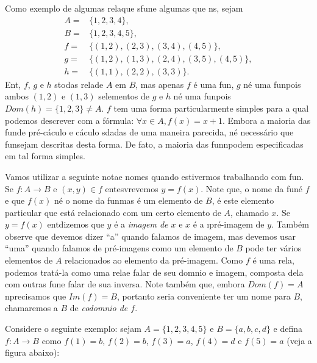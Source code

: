 Como exemplo de algumas rela\coes que s\ao fun\coes e algumas que n\ao s\aoi, sejam
\begin{equation*}
 \begin{aligned}
A=&\{1,2,3,4\},\\
B=&\{1,2,3,4,5\},\\
f=&\{(1,2),(2,3),(3,4),(4,5)\},\\
g=&\{(1,2),(1,3),(2,4),(3,5),(4,5)\},\\
h=&\{(1,1),(2,2),(3,3)\}.
 \end{aligned}
\end{equation*}
Ent\aoi, $f$, $g$ e $h$ s\ao todas rela\coes de $A$ em $B$, mas apenas $f$ \'e uma fun\caoi, $g$ n\ao \'e uma fun\cao pois ambos $(1,2)$ e $(1,3)$ s\ao elementos de $g$ e $h$ n\ao \'e uma fun\cao pois $Dom(h)=\{1,2,3\}\neq A$. $f$ tem uma forma particularmente simples para a qual podemos descrever com a f\'ormula: $\forall x\in A, f(x)=x+1$. Embora a maioria das fun\coes de pr\'e-c\'aculo e c\'aculo s\ao dadas de uma maneira parecida, n\ao \'e necess\'ario que fun\coes sejam descritas desta forma. De fato, a maioria das fun\coes n\ao podem especificadas em tal forma simples.

Vamos utilizar a seguinte nota\cao e nomes quando estivermos trabalhando com fun\cois. Se $f:A\to B$ e $(x,y)\in f$ ent\ao esvrevemos $y=f(x)$. Note que, o nome da fun\cao \'e $f$ e que $f(x)$ n\ao \'e o nome da fun\cao mas \'e um elemento de $B$, \'e este elemento particular que est\'a relacionado com um certo elemento de $A$, chamado $x$. Se $y=f(x)$ ent\ao dizemos que $y$ \'e a {\it imagem de $x$} e $x$ \'e a {\i pr\'e-imagem de $y$.} Tamb\'em observe que devemos dizer ``a'' quando falamos de imagem, mas devemos usar ``uma'' quando falamos de pr\'e-imagens como um elemento de $B$ pode ter v\'arios elementos de $A$ relacionados ao elemento da pr\'e-imagem. Como $f$ \'e uma rela\caoi, podemos trat\'a-la como uma rela\cao e falar de seu dom\ih nio e imagem, composta dela com outras fun\coes e falar de sua inversa. Note tamb\'em que, embora $Dom(f)=A$ n\ao precisamos que $Im(f)=B$, portanto seria conveniente ter um nome para $B$, chamaremos a $B$ de {\it codom\ih nio de $f$}. 

Considere o seguinte exemplo: sejam $A=\{1,2,3,4,5\}$ e $B=\{a,b,c,d\}$ e defina $f:A\to B$ como $f(1)=b$, $f(2)=b$, $f(3)=a$, $f(4)=d$ e $f(5)=a$ (veja a figura abaixo):

